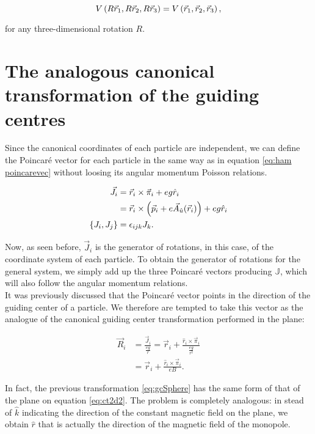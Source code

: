 \begin{equation*}
 V\left( R\vec{r}_1,R\vec{r}_2,R\vec{r}_3 \right) =  V\left( \vec{r}_1,\vec{r}_2,\vec{r}_3 \right),
\end{equation*}

for any three-dimensional rotation $R$.\\

\section{The analogous canonical transformation of the guiding centres}
Since the canonical coordinates of each particle are independent, we can define the Poincar\'e vector for each particle in the same way as in equation \eqref{eq:ham poincarevec} without loosing its angular momentum Poisson relations.

\begin{align*}
\vec{J}_i &= \vec{r}_i\times\vec{\pi}_i + eg\hat{r}_i\\
&= \vec{r}_i\times\left( \vec{p}_i+e\vec{A}_{\hat{u}}(\vec{r}_i) \right) + eg\hat{r}_i\\
\left\lbrace J_i, J_j \right\rbrace &= \epsilon_{ijk}J_k.
\end{align*}

Now, as seen before, $\vec{J}_i$ is the generator of rotations, in this case, of the coordinate system of each particle. To obtain the generator of rotations for the general system, we simply add up the three Poincar\'e vectors producing $\mathbb{J}$, which will also follow the angular momentum relations.\\

It was previously discussed that the Poincar\'e vector points in the direction of the guiding center of a particle. We therefore are tempted to take this vector as the analogue of the canonical guiding center transformation performed in the plane:

\begin{align}
\vec{R}_i &= \frac{\vec{J}_i}{\frac{eg}{r}} = \vec{r}_i + \frac{\hat{r}_i\times\vec{\pi}_i}{\frac{eg}{r^2}} \nonumber\\
&= \vec{r}_i + \frac{\hat{r}_i\times\vec{\pi}_i}{eB}.
\label{eq:gcSphere}
\end{align}

In fact, the previous transformation \eqref{eq:gcSphere} has the same form of that of the plane on equation \eqref{eq:ct2d2}. The problem is completely analogous: in stead of $\hat{k}$ indicating the direction of the constant magnetic field on the plane, we obtain $\hat{r}$ that is actually the direction of the magnetic field of the monopole. \\


